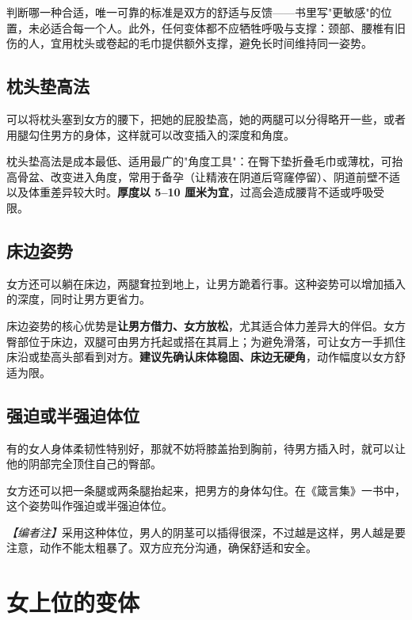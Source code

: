 \documentclass[12pt,UTF8]{ctexbook}
\begin{document}
判断哪一种合适，唯一可靠的标准是双方的舒适与反馈——书里写"更敏感"的位置，未必适合每一个人。此外，任何变体都不应牺牲呼吸与支撑：颈部、腰椎有旧伤的人，宜用枕头或卷起的毛巾提供额外支撑，避免长时间维持同一姿势。

\subsection{枕头垫高法}

可以将枕头塞到女方的腰下，把她的屁股垫高，她的两腿可以分得略开一些，或者用腿勾住男方的身体，这样就可以改变插入的深度和角度。

\vspace{0.5em}

枕头垫高法是成本最低、适用最广的"角度工具"：在臀下垫折叠毛巾或薄枕，可抬高骨盆、改变进入角度，常用于备孕（让精液在阴道后穹窿停留）、阴道前壁不适以及体重差异较大时。\textbf{厚度以 5--10 厘米为宜}，过高会造成腰背不适或呼吸受限。

\subsection{床边姿势}

女方还可以躺在床边，两腿耷拉到地上，让男方跪着行事。这种姿势可以增加插入的深度，同时让男方更省力。

\vspace{0.5em}

床边姿势的核心优势是\textbf{让男方借力、女方放松}，尤其适合体力差异大的伴侣。女方臀部位于床边，双腿可由男方托起或搭在其肩上；为避免滑落，可让女方一手抓住床沿或垫高头部看到对方。\textbf{建议先确认床体稳固、床边无硬角}，动作幅度以女方舒适为限。

\subsection{强迫或半强迫体位}

有的女人身体柔韧性特别好，那就不妨将膝盖抬到胸前，待男方插入时，就可以让他的阴部完全顶住自己的臀部。

女方还可以把一条腿或两条腿抬起来，把男方的身体勾住。在《箴言集》一书中，这个姿势叫作强迫或半强迫体位。

\vspace{0.5em}
\noindent\textit{【编者注】}采用这种体位，男人的阴茎可以插得很深，不过越是这样，男人越是要注意，动作不能太粗暴了。双方应充分沟通，确保舒适和安全。

\vspace{0.5em}
\section{女上位的变体}
\end{document}
